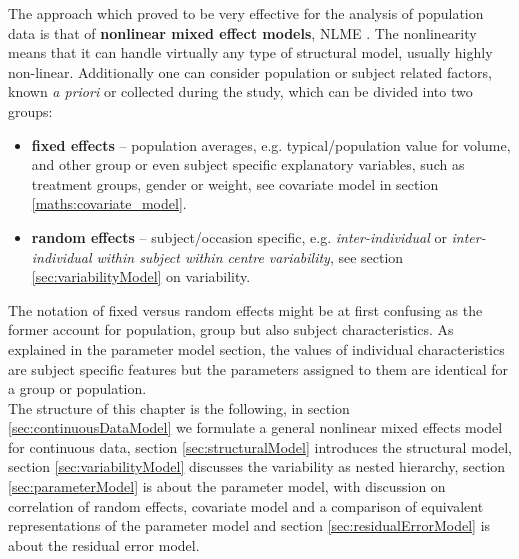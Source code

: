 The approach which proved to be very effective for the analysis of population 
data is that of \textbf{nonlinear mixed effect models}, NLME 
\cite{Bonate:2011fk,LavielleBook:2014}. 
The nonlinearity means that it can handle virtually any type of structural 
model, usually highly non-linear. Additionally one can consider population 
or subject related factors, known \emph{a priori} or collected during the 
study, which can be divided into two groups:
\begin{itemize}
\item
\textbf{fixed effects} -- population averages, e.g. typical/population value 
for volume, and other group or even subject specific explanatory variables, 
such as treatment groups, gender or weight, see covariate model in 
section \ref{maths:covariate_model}.
\item
\textbf{random effects} -- subject/occasion specific, e.g. \textit{inter-individual} 
or \textit{inter-individual within subject within centre variability}, see section 
\ref{sec:variabilityModel} on variability.
\end{itemize}
The notation of fixed versus random effects might be at first confusing as the 
former account for population, group but also subject characteristics. As 
explained in the parameter model section, the values of individual characteristics 
are subject specific features but the parameters assigned to them are identical 
for a group or population. \\
The structure of this chapter is the following, in section \ref{sec:continuousDataModel} 
we formulate a general nonlinear mixed effects model for continuous data, 
section \ref{sec:structuralModel} introduces the structural model, section 
\ref{sec:variabilityModel} discusses the variability as nested hierarchy, section 
\ref{sec:parameterModel} is about the parameter model, with discussion on 
correlation of random effects, covariate model and a comparison of equivalent 
representations of the parameter model and section \ref{sec:residualErrorModel} 
is about the residual error model. 













